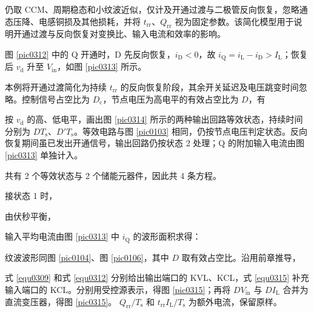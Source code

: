 仍取 CCM、周期稳态和小纹波近似，仅计及开通过渡与二极管反向恢复，忽略通态压降、电感铜损及其他损耗，并将 $t_{\mathrm{rr}}$、$Q_{\mathrm{rr}}$ 视为固定参数。该简化模型用于说明开通过渡与反向恢复对变换比、输入电流和效率的影响。



图 \ref{pic0312} 中的 $\mathrm{Q}$ 开通时，$\mathrm{D}$ 先反向恢复，$i_{\mathrm{D}}<0$，故 $i_{\mathrm{Q}}=i_{\mathrm{L}}-i_{\mathrm{D}}>I_{\mathrm{L}}$；恢复后 $v_{\mathrm{d}}$ 升至 $V_{\mathrm{in}}$，如图 \ref{pic0313} 所示。


本例将开通过渡简化为持续 $t_{\mathrm{rr}}$ 的反向恢复阶段，其余开关延迟及电压跳变时间忽略。控制信号占空比为 $D_{\mathrm{c}}$，节点电压为高电平的有效占空比为 $D$，有


按 $v_{\mathrm{d}}$ 的高、低电平，画出图 \ref{pic0314} 所示的两种输出回路等效状态，持续时间分别为 $DT_{\mathrm{s}}$、$D'T_{\mathrm{s}}$。等效电路与图 \ref{pic0103} 相同，仍按节点电压判定状态。反向恢复期间虽已发出开通信号，输出回路仍按状态 2 处理；$\mathrm{Q}$ 的附加输入电流由图 \ref{pic0313} 单独计入。


共有 2 个等效状态与 2 个储能元器件，因此共 4 条方程。


接状态 1 时，


由伏秒平衡，

输入平均电流由图 \ref{pic0313} 中 $i_{\mathrm{Q}}$ 的波形面积求得：


纹波波形同图 \ref{pic0104}、图 \ref{pic0106}，其中 $D$ 取有效占空比。沿用前章推导，


式 \eqref{equ0309} 和式 \eqref{equ0312} 分别给出输出端口的 KVL、KCL，式 \eqref{equ0315} 补充输入端口的 KCL。分别用受控源表示，得图 \ref{pic0315}；再将 $DV_{\mathrm{in}}$ 与 $DI_{\mathrm{L}}$ 合并为直流变压器，得图 \ref{pic0315}。 $Q_{\mathrm{rr}}/T_{\mathrm{s}}$ 和 $t_{\mathrm{rr}}I_{\mathrm{L}}/T_{\mathrm{s}}$ 为额外电流，保留原样。


